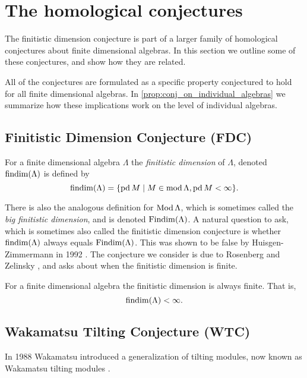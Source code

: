 \section{The homological conjectures}\label{sec:homological_conjectures}

The finitistic dimension conjecture is part of a larger family of homological conjectures about finite dimensional algebras. In this section we outline some of these conjectures, and show how they are related.

All of the conjectures are formulated as a specific property conjectured to hold for all finite dimensional algebras. In \cref{prop:conj_on_individual_algebras} we summarize how these implications work on the level of individual algebras.

\subsection*{Finitistic Dimension Conjecture (FDC)}
\begin{defn}
	For a finite dimensional algebra $\Lambda$ the \emph{finitistic dimension} of $\Lambda$, denoted $\operatorname{findim}(\Lambda)$ is defined by
	$$\operatorname{findim}(\Lambda) = \{\operatorname{pd} M \mid M \in \operatorname{mod}\Lambda, \operatorname{pd} M < \infty\}.$$
\end{defn}

There is also the analogous definition for $\operatorname{Mod}\Lambda$, which is sometimes called the \emph{big finitistic dimension}, and is denoted $\operatorname{Findim}(\Lambda)$. A natural question to ask, which is sometimes also called the finitistic dimension conjecture is whether $\operatorname{findim}(\Lambda)$ always equals $\operatorname{Findim}(\Lambda)$. This was shown to be false by Huisgen-Zimmermann in 1992 \cite{ZH92}. The conjecture we consider is due to Rosenberg and Zelinsky \cite{Bass60}, and asks about when the finitistic dimension is finite.

\begin{conj}
	For a finite dimensional algebra the finitistic dimension is always finite. That is,
	$$\operatorname{findim}(\Lambda) < \infty.$$
\end{conj}

\subsection*{Wakamatsu Tilting Conjecture (WTC)}
In 1988 Wakamatsu introduced a generalization of tilting modules, now known as Wakamatsu tilting modules \cite{Wak88}.

